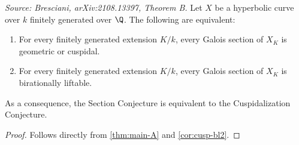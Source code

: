 \begin{theorem}[TheoremB]
  \label{thm:main-B}
  \textit{Source: Bresciani, arXiv:2108.13397, Theorem B.}
  Let \(X\) be a hyperbolic curve over \(k\) finitely generated over \(\Q\). The
  following are equivalent:
  \begin{enumerate}
    \item For every finitely generated extension \(K/k\), every Galois section of
      \(X_K\) is geometric or cuspidal.
    \item For every finitely generated extension \(K/k\), every Galois section of
      \(X_K\) is birationally liftable.
  \end{enumerate}
  As a consequence, the Section Conjecture is equivalent to the Cuspidalization
  Conjecture.
\end{theorem}

\begin{proof}
  Follows directly from \cref{thm:main-A} and \cref{cor:cusp-bl2}.
\end{proof}

